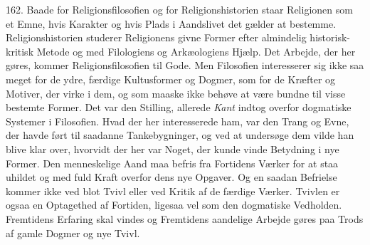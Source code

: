 \documentclass[12pt,a4paper]{book}
\begin{document}
162. Baade for Religionsfilosofien og for Religionshistorien staar Religionen som et Emne,
hvis Karakter og hvis Plads i Aandslivet det gælder at bestemme. Religionshistorien studerer
Religionens givne Former efter almindelig historisk-kritisk Metode og med Filologiens og
Arkæologiens Hjælp. Det Arbejde, der her gøres, kommer Religionsfilosofien til Gode. Men
Filosofien interesserer sig ikke saa meget for de ydre, færdige Kultusformer og Dogmer, som
for de Kræfter og Motiver, der virke i dem, og som maaske ikke behøve at være bundne til
visse bestemte Former. Det var den Stilling, allerede \emph{Kant} indtog overfor dogmatiske
Systemer i Filosofien. Hvad der her interesserede ham, var den Trang og Evne, der havde ført
til saadanne Tankebygninger, og ved at undersøge dem vilde han blive klar over, hvorvidt der
her var Noget, der kunde vinde Betydning i nye Former. Den menneskelige Aand maa befris fra
Fortidens Værker for at staa uhildet og med fuld Kraft overfor dens nye Opgaver. Og en saadan
Befrielse kommer ikke ved blot Tvivl eller ved Kritik af de færdige Værker. Tvivlen er ogsaa
en Optagethed af Fortiden, ligesaa vel som den dogmatiske Vedholden. Fremtidens Erfaring skal
vindes og Fremtidens aandelige Arbejde gøres paa Trods af gamle Dogmer og nye Tvivl.
\end{document}
